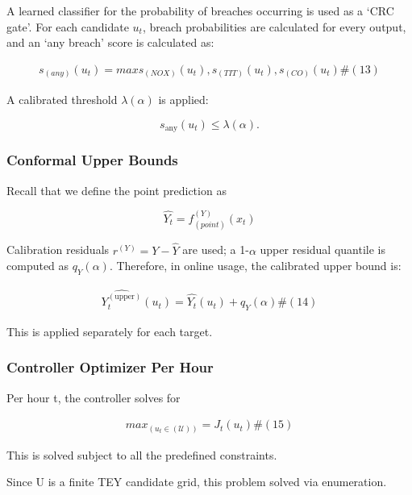 \documentclass[11pt]{article}
\begin{document}
A learned classifier for the probability of breaches occurring is used
as a `CRC gate'. For each candidate \(u_{t}\), breach probabilities are
calculated for every output, and an `any breach' score is calculated as:

\[\begin{array}{r}
s_{(any)}\left( u_{t} \right) = maxs_{(NOX)}\left( u_{t} \right),s_{(TIT)}\left( u_{t} \right),s_{(CO)}\left( u_{t} \right)\#(13)
\end{array}\]

A calibrated threshold \(\lambda(\alpha)\) is applied:

\[s_{\text{any}}\left( u_{t} \right) \leq \lambda(\alpha).\]

\subsubsection{Conformal Upper Bounds}\label{conformal-upper-bounds}

Recall that we define the point prediction as

\[\widehat{Y_{t}} = f_{(point)}^{(Y)}\left( x_{t} \right)\]

Calibration residuals \(r^{(Y)} = Y - \widehat{Y}\) are used; a
1-\(\alpha\) upper residual quantile is computed as \(q_{Y}(\alpha)\).
Therefore, in online usage, the calibrated upper bound is:

\[\begin{array}{r}
\widehat{Y_{t}^{\left( \text{upper} \right)}}\left( u_{t} \right) = \widehat{Y_{t}}\left( u_{t} \right) + q_{Y}(\alpha)\#(14)
\end{array}\]

This is applied separately for each target.

\subsubsection{Controller Optimizer Per
Hour}\label{controller-optimizer-per-hour}

Per hour t, the controller solves for

\[\begin{array}{r}
max_{\left( u_{t} \in \left( \mathcal{U} \right) \right)}{= J}_{t}\left( u_{t} \right)\#(15)
\end{array}\]

This is solved subject to all the predefined constraints.

Since U is a finite TEY candidate grid, this problem solved via
enumeration.
\end{document}
